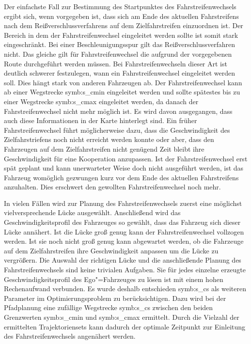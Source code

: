 Der einfachste Fall zur Bestimmung des Startpunktes des Fahrstreifenwechsels ergibt sich, wenn vorgegeben ist, dass sich am Ende des aktuellen Fahrstreifens nach dem Rei{\ss}verschlussverfahrens auf dem Zielfahrstreifen einzuordnen ist.
Der Bereich in dem der Fahrstreifenwechsel eingeleitet werden sollte ist somit stark eingeschr\"ankt.
Bei einer Beschleunigungsspur gilt das Rei{\ss}verschlussverfahren nicht.
Das gleiche gilt f\"ur Fahrstreifenwechsel die aufgrund der vorgegebenen Route durchgef\"uhrt werden m\"ussen.
Bei Fahrstreifenwechseln dieser Art ist deutlich schwerer festzulegen, wann ein Fahrstreifenwechsel eingeleitet werden soll.
Dies h\"angt stark von anderen Fahrzeugen ab.
Der Fahrstreifenwechsel kann ab einer Wegstrecke \gls{symb:s_cmin} eingeleitet werden und sollte sp\"atestes bis zu einer Wegstrecke  \gls{symb:s_cmax} eingeleitet werden, da danach der Fahrstreifenwechsel nicht mehr m\"oglich ist.
Es wird davon ausgegangen, dass auch diese Informationen in der Karte hinterlegt sind.
Ein fr\"uher Fahrstreifenwechsel f\"uhrt m\"oglicherweise dazu, dass die Geschwindigkeit des Zielfahrstriefens noch nicht erreicht werden konnte oder aber, dass den Fahrzeugen auf dem Zielfahrstreifen nicht gen\"ugend Zeit bleibt ihre Geschwindigkeit f\"ur eine Kooperation anzupassen.
Ist der Fahrstreifenwechsel erst sp\"at geplant und kann unerwarteter Weise doch nicht ausgef\"uhrt werden, ist das Fahrzeug wom\"oglich gezwungen kurz vor dem Ende des aktuellen Fahrstreifens anzuhalten.
Dies erschwert den gewollten Fahrstreifenwechsel noch mehr.

In vielen F\"allen wird zur Planung des Fahrstreifenwechsels zuerst eine m\"oglichst vielversprechende L\"ucke ausgew\"ahlt.
Anschlie{\ss}end wird das Geschwindigkeitsprofil des Fahrzeuges so gew\"ahlt, dass das Fahrzeug sich dieser L\"ucke ann\"ahert.
Ist die L\"ucke gro{\ss} genug kann der Fahrstreifenwechsel vollzogen werden.
Ist sie noch nicht gro{\ss} genug kann abgewartet werden, ob die Fahrzeuge auf dem Zielfahrstreifen ihre Geschwindigkeit anpassen um die L\"ucke zu vergr\"o{\ss}ern.
Die Auswahl der richtigen L\"ucke und die anschlie{\ss}ende Planung des Fahrstreifenwechsels sind keine trivialen Aufgaben.
Sie f\"ur jedes einzelne erzeugte Geschwindigkeitsprofil des Ego"=Fahrzeuges zu l\"osen ist mit einem hohen Rechenaufwand verbunden.
Es wurde deshalb entschieden \gls{symb:s_cs} als weiteren Parameter im Optimierungsproblem zu ber\"ucksichtigen.
Dazu wird bei der Pfadplanung eine zuf\"allige Wegstrecke \gls{symb:s_cs} zwischen den beiden Grenzwerten \gls{symb:s_cmin} und \gls{symb:s_cmax} ermittelt.
Durch die Vielzahl der ermittelten Trajektoriensets kann dadurch der optimale Zeitpunkt zur Einleitung des Fahrstreifenwechsels angen\"ahert werden.


